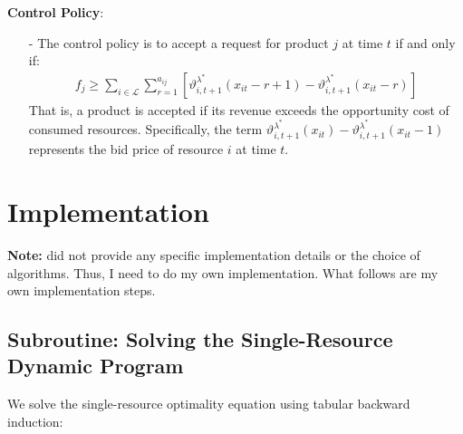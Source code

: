 \documentclass[11pt]{article}
\begin{document}
\vspace{0.5cm}

\noindent
\textbf{Control Policy}:
\begin{itemize}
\item[-] The control policy is to accept a request for product $j$ at time $t$ if and only if:
    \begin{align*}
        f_j \geq \sum_{i \in \mathcal{L}} \sum_{r = 1}^{a_{ij}} \left[ \vartheta^{\lambda^{*}}_{i,t+1}(x_{it} - r + 1) - \vartheta^{\lambda^{*}}_{i,t+1}(x_{it} - r) \right]
    \end{align*}
    That is, a product is accepted if its revenue exceeds the opportunity cost of consumed resources. 
    Specifically, the term $\vartheta^{\lambda^{*}}_{i,t+1}(x_{it}) - \vartheta^{\lambda^{*}}_{i,t+1}(x_{it} - 1)$ represents the bid price of resource $i$ at time $t$.
\end{itemize}


\vspace{0.5cm}




\section{Implementation}

\noindent
\textbf{Note:} \cite{topaloglu2009using} did not provide any specific implementation details or the choice of algorithms. Thus, I need to do my own implementation. What follows are my own implementation steps.

\vspace{0.5cm}




\subsection{Subroutine: Solving the Single-Resource Dynamic Program}

\noindent
We solve the single-resource optimality equation using tabular backward induction:
\end{document}
